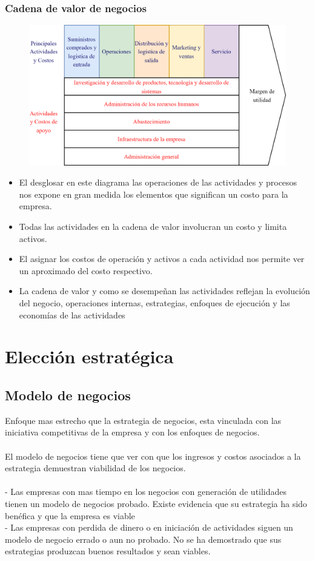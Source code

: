 \documentclass{templateNote}
\begin{document}
\subsubsection{Cadena de valor de negocios}
\begin{figure}[H]
    \centering
    \includegraphics[width=1\textwidth]{img/costosdenoseque.png}
\end{figure}

\begin{itemize}
    \item El desglosar en este diagrama las operaciones de las actividades y procesos nos expone en gran medida los elementos que significan un costo para la empresa.
    \item Todas las actividades en la cadena de valor involucran un costo y limita activos.
    \item El asignar los costos de operación y activos a cada actividad nos permite ver un aproximado del costo respectivo.
    \item La cadena de valor y como se desempeñan las actividades reflejan la evolución del negocio, operaciones internas, estrategias, enfoques de ejecución y las economías de las actividades
\end{itemize}

\newpage


\section{Elección estratégica}
\subsection{Modelo de negocios}
\noindent Enfoque mas estrecho que la estrategia de negocios, esta vinculada con las iniciativa competitivas de la empresa y con los enfoques de negocios.\\\\
El modelo de negocios tiene que ver con que los ingresos y costos asociados a la estrategia demuestran viabilidad de los negocios.\\\\
- Las empresas con mas tiempo en los negocios con generación de utilidades tienen un modelo de negocios probado. Existe evidencia que su estrategia ha sido benéfica y que la empresa es viable\\
- Las empresas con perdida de dinero o en iniciación de actividades siguen un modelo de negocio errado o aun no probado. No se ha demostrado que sus estrategias produzcan buenos resultados y sean viables.
\end{document}
